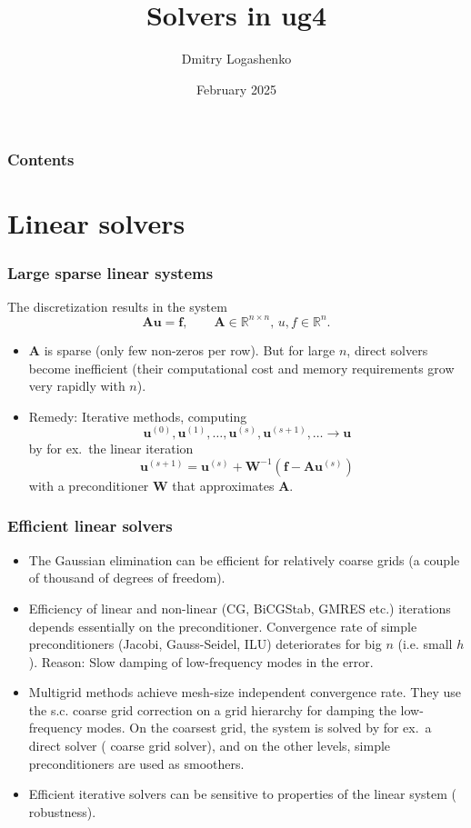 \documentclass[xcolor=dvipsnames]{beamer}
\title
 [ug4: Solvers]
 {Solvers in ug4}
\author [D. Logashenko] {Dmitry Logashenko}
\institute [CEMSE]
{CEMSE, KAUST, Saudi Arabia}
\date [Feb. 2025] {February 2025}
\begin{document}
\frame {\titlepage}

\begin {frame} [t]
\frametitle {Contents}
\tableofcontents
\end {frame}

\section {Linear solvers}

\begin {frame} [t]
\frametitle {Large sparse linear systems}
The discretization results in the system
$$
	\mathbf{A} \mathbf{u} = \mathbf{f}, \qquad \mathbf{A} \in \mathbb{R}^{n \times n}, \, u, f \in \mathbb{R}^n.
$$
\vspace {-3ex}
\begin {itemize}
	\pause
	\item $\mathbf{A}$ is {\color{blue} sparse} (only few non-zeros per row).
		But {\color{blue}for large $n$, direct solvers become inefficient}
		(their computational cost and memory requirements grow
		very rapidly with $n$).
	\pause
	\item Remedy: {\color{blue} Iterative methods}, computing
		$$
			\mathbf{u}^{(0)}, \mathbf{u}^{(1)}, \dots, \mathbf{u}^{(s)}, \mathbf{u}^{(s+1)}, \dots \to \mathbf{u}
		$$
		by for ex.\ the linear iteration
		$$
			\mathbf{u}^{(s+1)} = \mathbf{u}^{(s)} + \mathbf{W}^{-1} (\mathbf{f} - \mathbf{A} \mathbf{u}^{(s)})
		$$
		with a {\color{blue} preconditioner} $\mathbf{W}$ that approximates $\mathbf{A}$.
\end {itemize}
\end {frame}

\begin {frame} [t]
\frametitle {Efficient linear solvers}
\vspace {-2ex}
\begin {itemize}
	\item The Gaussian elimination can be {\color{blue} efficient for relatively coarse grids}
		(a couple of thousand of degrees of freedom).
	\pause
	\item Efficiency of linear and non-linear (CG, BiCGStab, GMRES etc.) iterations
		depends essentially on {\color{blue} the preconditioner}. Convergence rate of simple preconditioners
		(Jacobi, Gauss-Seidel, ILU) {\color{blue} deteriorates for big $n$} (i.e. small $h$). Reason:
		Slow damping of low-frequency modes in the error.
	\pause
	\item {\color{blue} Multigrid methods} achieve mesh-size independent convergence rate.
		They use the s.c. coarse grid correction on a grid hierarchy for damping the low-frequency modes.
		On the coarsest grid, the system is solved by for ex.\ a direct solver ({\color{blue}
		coarse grid solver}), and on the other levels, simple preconditioners are used as
		{\color{blue} smoothers}.
	\pause
	\item Efficient iterative solvers can be sensitive to properties of the linear
		system ({\color{blue} robustness}).
\end {itemize}
\end {frame}
\end{document}

